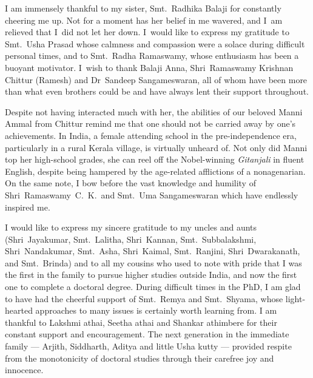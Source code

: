 I am immensely thankful to my sister, Smt.~Radhika Balaji for constantly
cheering me up. Not for a moment has her belief in me wavered, and I~am relieved
that I~did not let her down. I~would like to express my gratitude to Smt.~Usha
Prasad whose calmness and compassion were a solace during difficult personal
times, and to Smt.~Radha Ramaswamy, whose enthusiasm has been a  buoyant
motivator. I~wish to thank Balaji Anna, Shri~Ramaswamy Krishnan Chittur (Ramesh)
and Dr~Sandeep Sangameswaran, all of whom have been more than what even brothers
could be and have always lent their support throughout.



Despite not having interacted much with her, the abilities of our beloved Manni
Ammal from Chittur remind me that one should not be carried away by one's
achievements. In India, a female attending school in the pre-independence era,
particularly in a rural Kerala village, is virtually unheard of. Not only did
Manni top her high-school grades, she can reel off the Nobel-winning
\emph{Gitanjali} in fluent English, despite being hampered by the age-related
afflictions of a nonagenarian. On the same note, I bow before the
vast knowledge and humility of Shri~Ramaswamy~C.~K.\ and Smt.~Uma Sangameswaran
which have endlessly inspired me.


I would like to express my sincere gratitude to my uncles and aunts
(Shri~Jayakumar, Smt.~Lalitha, Shri~Kannan, Smt.~Subbalakshmi, Shri~Nandakumar,
Smt.~Asha, Shri~Kaimal, Smt.~Ranjini, Shri~Dwarakanath, and Smt.~Brinda) and to
all my cousins who used to note with pride that I was the first in the family to
pursue higher studies outside India, and now the first one to complete a
doctoral degree. During  difficult times in the PhD, I am glad to have had the
cheerful support of Smt.~Remya and Smt.~Shyama, whose light-hearted approaches
to many issues is certainly worth learning from. I am thankful to Lakshmi athai,
Seetha athai and Shankar athimbere for their constant support and encouragement.
The next generation in the immediate family --- Arjith, Siddharth, Aditya and
little Usha kutty --- provided respite from the monotonicity of doctoral studies
through their carefree joy and innocence.


